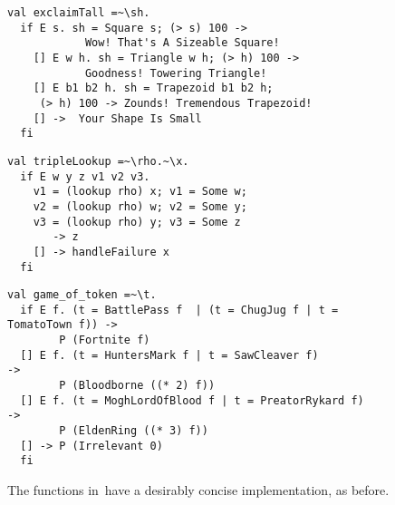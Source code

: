 \documentclass[manuscript,screen 12pt, nonacm]{acmart}
\begin{document}
    
    \begin{figure}[ht] 
      \begin{minipage}[h]{0.54\linewidth}
        \vmlst 
        \begin{lstlisting}[numbers=none, basicstyle=\tiny, xleftmargin=.2em,
          showstringspaces=false,
          frame=single]
val exclaimTall =~\sh.
  if E s. sh = Square s; (> s) 100 -> 
            Wow! That's A Sizeable Square!  
    [] E w h. sh = Triangle w h; (> h) 100 ->
            Goodness! Towering Triangle!
    [] E b1 b2 h. sh = Trapezoid b1 b2 h; 
     (> h) 100 -> Zounds! Tremendous Trapezoid!
    [] ->  Your Shape Is Small
  fi 
  \end{lstlisting}
          \label{fig:vmexclaimtall} 
      \end{minipage}%
      \begin{minipage}[h]{0.5\linewidth}
        \vmlst 
        \begin{lstlisting}[numbers=none, basicstyle=\tiny, xleftmargin=2em,
                      frame=single]
val tripleLookup =~\rho.~\x.
  if E w y z v1 v2 v3. 
    v1 = (lookup rho) x; v1 = Some w; 
    v2 = (lookup rho) w; v2 = Some y; 
    v3 = (lookup rho) y; v3 = Some z 
       -> z 
    [] -> handleFailure x
  fi 
   \end{lstlisting}
            \label{fig:vmtriplelookup} 
        \vspace{4ex}
      \end{minipage} 
      \begin{minipage}[h]{\linewidth}
        \vmlst 
        \begin{lstlisting}[numbers=none, basicstyle=\tiny, xleftmargin=9em,
          showstringspaces=false,
          frame=single]
val game_of_token =~\t. 
  if E f. (t = BattlePass f  | (t = ChugJug f | t = TomatoTown f)) -> 
        P (Fortnite f)
  [] E f. (t = HuntersMark f | t = SawCleaver f)                   -> 
        P (Bloodborne ((* 2) f))
  [] E f. (t = MoghLordOfBlood f | t = PreatorRykard f)            -> 
        P (EldenRing ((* 3) f))
  [] -> P (Irrelevant 0)
  fi 
\end{lstlisting}
          \label{fig:vmgot}
      \vspace{4ex}
      \end{minipage}%
      \caption{The functions in~\VMinus have a desirably concise
      implementation, as before.}
  \label{fig:vminusfuncs}
    \end{figure}   
\end{document}
